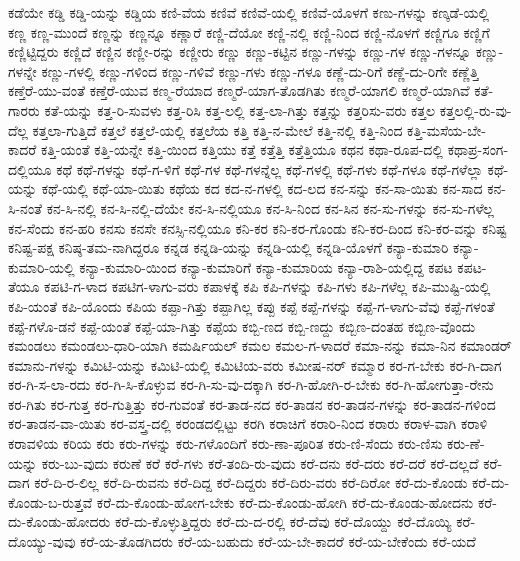 {ಕಡೆಯೇ
ಕಡ್ಡಿ
ಕಡ್ಡಿ-ಯನ್ನು
ಕಡ್ಡಿಯ
ಕಣಿ-ವೆಯ
ಕಣಿವೆ
ಕಣಿವೆ-ಯಲ್ಲಿ
ಕಣಿವೆ-ಯೊಳಗೆ
ಕಣು-ಗಳನ್ನು
ಕಣ್ಕಡೆ-ಯಲ್ಲಿ
ಕಣ್ಣ
ಕಣ್ಣ-ಮುಂದೆ
ಕಣ್ಣನ್ನು
ಕಣ್ಣನ್ನೂ
ಕಣ್ಣಾರೆ
ಕಣ್ಣಿ-ದೆಯೋ
ಕಣ್ಣಿ-ನಲ್ಲಿ
ಕಣ್ಣಿ-ನಿಂದ
ಕಣ್ಣಿ-ನೊಳಗೆ
ಕಣ್ಣಿಗೂ
ಕಣ್ಣಿಗೆ
ಕಣ್ಣಿಟ್ಟಿದ್ದರು
ಕಣ್ಣಿದೆ
ಕಣ್ಣಿನ
ಕಣ್ಣೀ-ರನ್ನು
ಕಣ್ಣೀರು
ಕಣ್ಣು
ಕಣ್ಣು-ಕಟ್ಟಿನ
ಕಣ್ಣು-ಗಳನ್ನು
ಕಣ್ಣು-ಗಳ
ಕಣ್ಣು-ಗಳನ್ನೂ
ಕಣ್ಣು-ಗಳನ್ನೇ
ಕಣ್ಣು-ಗಳಲ್ಲಿ
ಕಣ್ಣು-ಗಳಿಂದ
ಕಣ್ಣು-ಗಳಿವೆ
ಕಣ್ಣು-ಗಳು
ಕಣ್ಣು-ಗಳೂ
ಕಣ್ಣೆ-ದು-ರಿಗೆ
ಕಣ್ಣೆ-ದು-ರಿಗೇ
ಕಣ್ಣೆತ್ತಿ
ಕಣ್ತೆರೆ-ಯು-ವಂತೆ
ಕಣ್ತೆರೆ-ಯುವ
ಕಣ್ಮ-ರೆಯಾದ
ಕಣ್ಮರೆ-ಯಾಗ-ತೊಡಗಿತು
ಕಣ್ಮರೆ-ಯಾಗಲಿ
ಕಣ್ಮರೆ-ಯಾಗಿವೆ
ಕತೆ-ಗಾರರು
ಕತೆ-ಯನ್ನು
ಕತ್ತ-ರಿ-ಸುವಳು
ಕತ್ತ-ರಿಸಿ
ಕತ್ತ-ಲಲ್ಲಿ
ಕತ್ತ-ಲಾ-ಗಿತ್ತು
ಕತ್ತನ್ನು
ಕತ್ತರಿಸು-ವರು
ಕತ್ತಲ
ಕತ್ತಲಲ್ಲಿ-ರು-ವು-ದೆಲ್ಲ
ಕತ್ತಲಾ-ಗುತ್ತಿದೆ
ಕತ್ತಲೆ
ಕತ್ತಲೆ-ಯಲ್ಲಿ
ಕತ್ತಲೆಯ
ಕತ್ತಿ
ಕತ್ತಿ-ನ-ಮೇಲೆ
ಕತ್ತಿ-ನಲ್ಲಿ
ಕತ್ತಿ-ನಿಂದ
ಕತ್ತಿ-ಮಸೆಯ-ಬೇ-ಕಾದರೆ
ಕತ್ತಿ-ಯಂತೆ
ಕತ್ತಿ-ಯನ್ನೇ
ಕತ್ತಿ-ಯಿಂದ
ಕತ್ತಿಯು
ಕತ್ತೆ
ಕತ್ತೆತ್ತಿ
ಕತ್ತೆತ್ತಿಯೂ
ಕಥನ
ಕಥಾ-ರೂಪ-ದಲ್ಲಿ
ಕಥಾಪ್ರ-ಸಂಗ-ದಲ್ಲಿಯೂ
ಕಥೆ
ಕಥೆ-ಗಳನ್ನು
ಕಥೆ-ಗ-ಳಿಗೆ
ಕಥೆ-ಗಳ
ಕಥೆ-ಗಳನ್ನೆಲ್ಲ
ಕಥೆ-ಗಳಲ್ಲಿ
ಕಥೆ-ಗಳು
ಕಥೆ-ಗಳೂ
ಕಥೆ-ಗಳೆಲ್ಲಾ
ಕಥೆ-ಯನ್ನು
ಕಥೆ-ಯಲ್ಲಿ
ಕಥೆ-ಯಾ-ಯಿತು
ಕಥೆಯ
ಕದ
ಕದ-ನ-ಗಳಲ್ಲಿ
ಕದ-ಲದ
ಕನ-ಸನ್ನು
ಕನ-ಸಾ-ಯಿತು
ಕನ-ಸಾದ
ಕನ-ಸಿ-ನಂತೆ
ಕನ-ಸಿ-ನಲ್ಲಿ
ಕನ-ಸಿ-ನಲ್ಲಿ-ದೆಯೇ
ಕನ-ಸಿ-ನಲ್ಲಿಯೂ
ಕನ-ಸಿ-ನಿಂದ
ಕನ-ಸಿನ
ಕನ-ಸು-ಗಳನ್ನು
ಕನ-ಸು-ಗಳೆಲ್ಲ
ಕನ-ಸೆಂದು
ಕನ-ಹರಿ
ಕನಸು
ಕನಸೇ
ಕನಸ್ಸಿ-ನಲ್ಲಿಯೂ
ಕನಿ-ಕರ
ಕನಿ-ಕರ-ಗೊಂಡು
ಕನಿ-ಕರ-ದಿಂದ
ಕನಿ-ಕರ-ವನ್ನು
ಕನಿಷ್ಟ
ಕನಿಷ್ಟ-ಪಕ್ಷ
ಕನಿಷ್ಠ-ತಮ-ನಾಗಿದ್ದರೂ
ಕನ್ನಡ
ಕನ್ನಡಿ-ಯನ್ನು
ಕನ್ನಡಿ-ಯಲ್ಲಿ
ಕನ್ನಡಿ-ಯೊಳಗೆ
ಕನ್ಯಾ-ಕುಮಾರಿ
ಕನ್ಯಾ-ಕುಮಾರಿ-ಯಲ್ಲಿ
ಕನ್ಯಾ-ಕುಮಾರಿ-ಯಿಂದ
ಕನ್ಯಾ-ಕುಮಾರಿಗೆ
ಕನ್ಯಾ-ಕುಮಾರಿಯ
ಕನ್ಯಾ-ರಾಶಿ-ಯಲ್ಲಿದ್ದ
ಕಪಟ
ಕಪಟ-ತೆಯೂ
ಕಪಟಿ-ಗ-ಳಾದ
ಕಪಟಿಗ-ಳಾಗು-ವರು
ಕಪಾಳಕ್ಕೆ
ಕಪಿ
ಕಪಿ-ಗಳನ್ನು
ಕಪಿ-ಗಳು
ಕಪಿ-ಗಳೆಲ್ಲ
ಕಪಿ-ಮುಷ್ಟಿ-ಯಲ್ಲಿ
ಕಪಿ-ಯಂತೆ
ಕಪಿ-ಯೊಂದು
ಕಪಿಯ
ಕಪ್ಪಾ-ಗಿತ್ತು
ಕಪ್ಪಾಗಿಲ್ಲ
ಕಪ್ಪು
ಕಪ್ಪೆ
ಕಪ್ಪೆ-ಗಳನ್ನು
ಕಪ್ಪೆ-ಗ-ಳಾಗು-ವೆವು
ಕಪ್ಪೆ-ಗಳಂತೆ
ಕಪ್ಪೆ-ಗಳೊ-ಡನೆ
ಕಪ್ಪೆ-ಯಂತೆ
ಕಪ್ಪೆ-ಯಾ-ಗಿತ್ತು
ಕಪ್ಪೆಯ
ಕಬ್ಬಿ-ಣದ
ಕಬ್ಬಿ-ಣದ್ದು
ಕಬ್ಬಿಣ-ದಂತಹ
ಕಬ್ಬಿಣ-ವೊಂದು
ಕಮಂಡಲು
ಕಮಂಡಲು-ಧಾರಿ-ಯಾಗಿ
ಕಮರ್ಷಿಯಲ್
ಕಮಲ
ಕಮಲ-ಗ-ಳಾದರೆ
ಕಮಾ-ನನ್ನು
ಕಮಾ-ನಿನ
ಕಮಾಂಡರ್
ಕಮಾನು-ಗಳನ್ನು
ಕಮಿಟಿ-ಯನ್ನು
ಕಮಿಟಿ-ಯಲ್ಲಿ
ಕಮಿಟಿಯ-ವರು
ಕಮೀಷ-ನರ್
ಕಮ್ಮಾರ
ಕರ-ಗ-ಬೇಕು
ಕರ-ಗಿ-ದಾಗ
ಕರ-ಗಿ-ಸ-ಲಾ-ರದು
ಕರ-ಗಿ-ಸಿ-ಕೊಳ್ಳುವ
ಕರ-ಗಿ-ಸು-ವು-ದಕ್ಕಾಗಿ
ಕರ-ಗಿ-ಹೋಗಿ-ರ-ಬೇಕು
ಕರ-ಗಿ-ಹೋಗುತ್ತಾ-ರೇನು
ಕರ-ಗಿತು
ಕರ-ಗುತ್ತ
ಕರ-ಗುತ್ತಿತ್ತು
ಕರ-ಗುವಂತೆ
ಕರ-ತಾಡ-ನದ
ಕರ-ತಾಡನ
ಕರ-ತಾಡನ-ಗಳನ್ನು
ಕರ-ತಾಡನ-ಗಳಿಂದ
ಕರ-ತಾಡನ-ವಾ-ಯಿತು
ಕರ-ವಸ್ತ್ರ-ದಲ್ಲಿ
ಕರಂಡದಲ್ಲಿಟ್ಟು
ಕರಗಿ
ಕರಾಚಿಗೆ
ಕರಾರಿ-ನಿಂದ
ಕರಾರು
ಕರಾಳ-ವಾಗಿ
ಕರಾಳಿ
ಕರಾವಳಿಯ
ಕರಿಯ
ಕರು
ಕರು-ಗಳನ್ನು
ಕರು-ಗಳೊಂದಿಗೆ
ಕರು-ಣಾ-ಪೂರಿತ
ಕರು-ಣಿ-ಸೆಂದು
ಕರು-ಣಿಸು
ಕರು-ಣೆ-ಯನ್ನು
ಕರು-ಬು-ವುದು
ಕರುಣೆ
ಕರೆ
ಕರೆ-ಗಳು
ಕರೆ-ತಂದಿ-ರು-ವುದು
ಕರೆ-ದನು
ಕರೆ-ದರು
ಕರೆ-ದರೆ
ಕರೆ-ದಲ್ಲದೆ
ಕರೆ-ದಾಗ
ಕರೆ-ದಿ-ರ-ಲಿಲ್ಲ
ಕರೆ-ದಿ-ರುವನು
ಕರೆ-ದಿದ್ದ
ಕರೆ-ದಿದ್ದರು
ಕರೆ-ದಿರು-ವರು
ಕರೆ-ದಿರೋ
ಕರೆ-ದು-ಕೊಂಡು
ಕರೆ-ದು-ಕೊಂಡು-ಬ-ರುತ್ತವೆ
ಕರೆ-ದು-ಕೊಂಡು-ಹೋಗ-ಬೇಕು
ಕರೆ-ದು-ಕೊಂಡು-ಹೋಗಿ
ಕರೆ-ದು-ಕೊಂಡು-ಹೋದನು
ಕರೆ-ದು-ಕೊಂಡು-ಹೋದರು
ಕರೆ-ದು-ಕೊಳ್ಳುತ್ತಿದ್ದರು
ಕರೆ-ದು-ದ-ರಲ್ಲಿ
ಕರೆ-ದೆವು
ಕರೆ-ದೊಯ್ದು
ಕರೆ-ದೊಯ್ಯಿ
ಕರೆ-ದೊಯ್ಯು-ವುವು
ಕರೆ-ಯ-ತೊಡಗಿದರು
ಕರೆ-ಯ-ಬಹುದು
ಕರೆ-ಯ-ಬೇ-ಕಾದರೆ
ಕರೆ-ಯ-ಬೇಕೆಂದು
ಕರೆ-ಯದೆ
}
